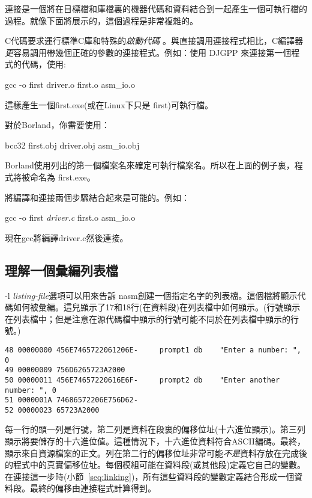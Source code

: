 連接是一個將在目標檔和庫檔裏的機器代碼和資料結合到一起產生一個可執行檔的過程。就像下面將展示的，這個過程是非常複雜的。

C代碼要求運行標準C庫和特殊的\emph{啟動代碼}
。與直接調用連接程式相比，C編譯器\emph{更}容易調用帶幾個正確的參數的連接程式。例如：使用
DJGPP 來連接第一個程式的代碼，使用:
\begin{CodeQuote}
gcc -o first driver.o first.o asm\_io.o
\end{CodeQuote}
這樣產生一個{\code first.exe}(或在Linux下只是{\code
first})可執行檔。

對於Borland，你需要使用：
\begin{CodeQuote}
bcc32 first.obj driver.obj asm\_io.obj
\end{CodeQuote}
Borland使用列出的第一個檔案名來確定可執行檔案名。所以在上面的例子裏，程式將被命名為{\code
first.exe}。

將編譯和連接兩個步驟結合起來是可能的。例如：
\begin{CodeQuote}
gcc -o first {\em driver.c} first.o asm\_io.o
\end{CodeQuote}
現在{\code gcc}將編譯{\code driver.c}然後連接。 

\subsection{理解一個彙編列表檔 }

{\code -l {\em listing-file}}選項可以用來告訴{\code
nasm}創建一個指定名字的列表檔。這個檔將顯示代碼如何被彙編。這兒顯示了17和18行(在資料段)在列表檔中如何顯示。(行號顯示在列表檔中；但是注意在源代碼檔中顯示的行號可能不同於在列表檔中顯示的行號。)
\begin{Verbatim}[xleftmargin=\AsmMargin]
48 00000000 456E7465722061206E-     prompt1 db    "Enter a number: ", 0
49 00000009 756D6265723A2000
50 00000011 456E74657220616E6F-     prompt2 db    "Enter another number: ", 0
51 0000001A 74686572206E756D62-
52 00000023 65723A2000
 \end{Verbatim}
每一行的頭一列是行號，第二列是資料在段裏的偏移位址(十六進位顯示)。第三列顯示將要儲存的十六進位值。這種情況下，十六進位資料符合ASCII編碼。最終，顯示來自資源檔案的正文。列在第二行的偏移位址非常可能\emph{不是}資料存放在完成後的程式中的真實偏移位址。每個模組可能在資料段(或其他段)定義它自己的變數。在連接這一步時(小節~\ref{seq:linking})，所有這些資料段的變數定義結合形成一個資料段。最終的偏移由連接程式計算得到。

